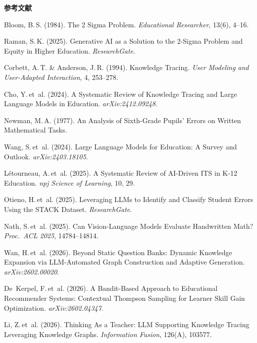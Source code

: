 \documentclass[paper=a4,fontsize=10.5bp,jafontsize=10.5bp,twocolumn]{jlreq}
\begin{document}
\vspace{1em}
\begin{small}
\noindent\textbf{参考文献}
\begin{enumerate}[leftmargin=2em,label={[\arabic*]}]
  \item Bloom, B.\,S. (1984). The 2 Sigma Problem. \textit{Educational Researcher}, 13(6), 4--16.
  \item Raman, S.\,K. (2025). Generative AI as a Solution to the 2-Sigma Problem and Equity in Higher Education. \textit{ResearchGate}.
  \item Corbett, A.\,T. \& Anderson, J.\,R. (1994). Knowledge Tracing. \textit{User Modeling and User-Adapted Interaction}, 4, 253--278.
  \item Cho, Y.\,et~al. (2024). A Systematic Review of Knowledge Tracing and Large Language Models in Education. \textit{arXiv:2412.09248}.
  \item Newman, M.\,A. (1977). An Analysis of Sixth-Grade Pupils' Errors on Written Mathematical Tasks.
  \item Wang, S.\,et~al. (2024). Large Language Models for Education: A Survey and Outlook. \textit{arXiv:2403.18105}.
  \item L\'{e}tourneau, A.\,et~al. (2025). A Systematic Review of AI-Driven ITS in K-12 Education. \textit{npj Science of Learning}, 10, 29.
  \item Otieno, H.\,et~al. (2025). Leveraging LLMs to Identify and Classify Student Errors Using the STACK Dataset. \textit{ResearchGate}.
  \item Nath, S.\,et~al. (2025). Can Vision-Language Models Evaluate Handwritten Math? \textit{Proc.\ ACL 2025}, 14784--14814.
  \item Wan, H.\,et~al. (2026). Beyond Static Question Banks: Dynamic Knowledge Expansion via LLM-Automated Graph Construction and Adaptive Generation. \textit{arXiv:2602.00020}.
  \item De~Kerpel, F.\,et~al. (2026). A Bandit-Based Approach to Educational Recommender Systems: Contextual Thompson Sampling for Learner Skill Gain Optimization. \textit{arXiv:2602.04347}.
  \item Li, Z.\,et~al. (2026). Thinking As a Teacher: LLM Supporting Knowledge Tracing Leveraging Knowledge Graphs. \textit{Information Fusion}, 126(A), 103577.
\end{enumerate}
\end{small}
\end{document}
